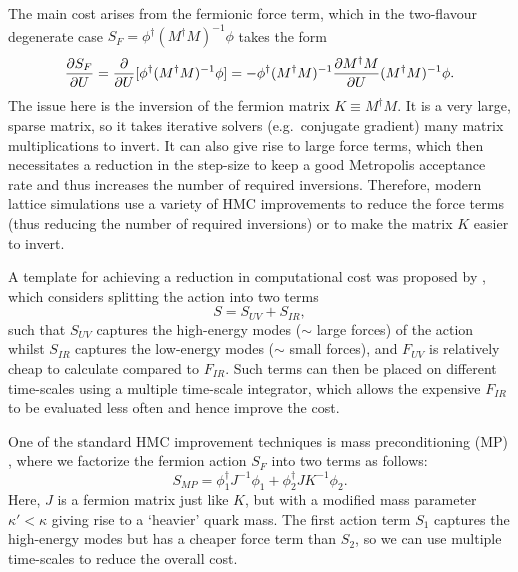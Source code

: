 The main cost arises from the fermionic force term, which in the two-flavour degenerate case $S_F = \phi^\dag (M^\dag M)^{-1} \phi$ takes the form
\begin{equation}
	\frac{\partial S_F}{\partial U} = \frac{\partial }{\partial U}[\phi^\dag (M^\dag M)^{-1} \phi] = - \phi^\dag (M^\dag M)^{-1} \frac{\partial M^\dag M}{\partial U} (M^\dag M)^{-1} \phi.
\end{equation}
The issue here is the inversion of the fermion matrix $K \equiv M^\dag M$. 
It is a very large, sparse matrix, so it takes iterative solvers (e.g.\ conjugate gradient) many matrix multiplications to invert.
It can also give rise to large force terms, which then necessitates a reduction in the step-size to keep a good Metropolis acceptance rate and thus increases the number of required inversions.
Therefore, modern lattice simulations use a variety of HMC improvements  to reduce the force terms (thus reducing the number of required inversions) or to make the matrix $K$ easier to invert.

A template for achieving a reduction in computational cost was proposed by \cite{Peardon:2002wb}, which considers splitting the action into two terms
\begin{equation}
	S = S_{UV} + S_{IR}, \label{eq:multiterm}
\end{equation}
such that
$S_{UV}$ captures the high-energy modes ($\sim$ large forces) of the action whilst $S_{IR}$ captures the low-energy modes ($\sim$ small forces), and
$F_{UV}$ is relatively cheap to calculate compared to $F_{IR}$.
Such terms can then be placed on different time-scales using a multiple  time-scale integrator, which allows the expensive $F_{IR}$ to be evaluated less often and hence improve the cost.%

One of the standard HMC improvement techniques is mass preconditioning (MP) \cite{Hasenbusch:2003}, where we factorize the fermion action $S_F$ into two terms as follows:
\begin{equation}
	S_{MP} = \phi_1^\dag J^{-1} \phi_1  + \phi_2^\dag JK^{-1} \phi_2.
\end{equation}
Here, $J$ is a fermion matrix just like $K$, but with a modified mass parameter $\kappa' < \kappa$ giving rise to a `heavier' quark mass.
The first action term $S_1$ captures the high-energy modes but has a cheaper force term than $S_2$, so we can use multiple time-scales to reduce the overall cost.

